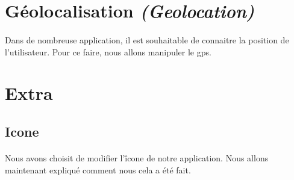 \documentclass[a4paper]{article}
\begin{document}
\begin{multicols}{2}
        \section{Géolocalisation \emph{(Geolocation)}}
            \paragraph{}
                Dans de nombreuse application, il est souhaitable de connaitre la position de l'utilisateur. Pour ce faire, nous allons manipuler le gps.
        \section{Extra}
            \subsection{Icone}
                \paragraph{}
                    Nous avons choisit de modifier l'îcone de notre application. Nous allons maintenant expliqué comment nous cela a été fait.


\end{multicols}
\end{document}
